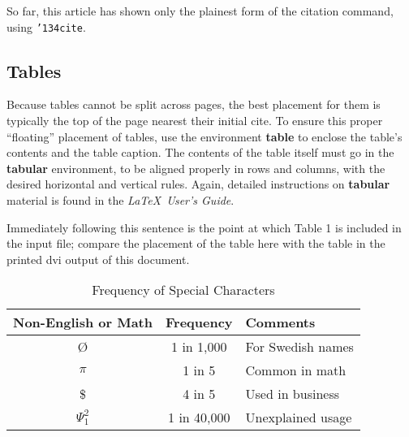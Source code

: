 \documentclass{sigkddExp}
\begin{document}
So far, this article has shown only the plainest form
of the citation command, using \texttt{{\char'134}cite}.
%

\subsection{Tables}
Because tables cannot be split across pages, the best
placement for them is typically the top of the page
nearest their initial cite.  To
ensure this proper ``floating'' placement of tables, use the
environment \textbf{table} to enclose the table's contents and
the table caption.  The contents of the table itself must go
in the \textbf{tabular} environment, to
be aligned properly in rows and columns, with the desired
horizontal and vertical rules.  Again, detailed instructions
on \textbf{tabular} material
is found in the \textit{\LaTeX\ User's Guide}.

Immediately following this sentence is the point at which
Table 1 is included in the input file; compare the
placement of the table here with the table in the printed
dvi output of this document.

\begin{table}
\centering
\caption{Frequency of Special Characters}
\begin{tabular}{|c|c|l|} \hline
Non-English or Math&Frequency&Comments\\ \hline
\O & 1 in 1,000& For Swedish names\\ \hline
$\pi$ & 1 in 5& Common in math\\ \hline
\$ & 4 in 5 & Used in business\\ \hline
$\Psi^2_1$ & 1 in 40,000& Unexplained usage\\
\hline\end{tabular}
\end{table}
\end{document}
